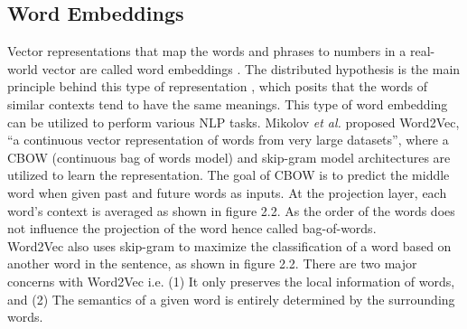 \documentclass[%
	BCOR=8mm, %
	DIV=12,
	toc=bibliography, %
	toc=listof, %
	oneside, %
	egregdoesnotlikesansseriftitles, %
	]{scrbook}
\begin{document}
\subsection{Word Embeddings}
\label{subsection:wordembeddings}
Vector representations that map the words and phrases to numbers in a real-world vector are called  word embeddings \cite{almeida_word_2019-1}. The distributed hypothesis is the main principle behind this type of representation \cite{harris_distributional_1954}, which posits that the words of similar contexts tend to have the same meanings. This type of word embedding can be utilized to perform various NLP tasks. Mikolov \textit{et al.} \cite{mikolov_efficient_2013} proposed Word2Vec, ``a continuous vector representation of words from very large datasets'', where a CBOW (continuous bag of words model) and skip-gram model architectures are utilized to learn the representation. The goal of CBOW is to predict the middle word when given past and future words as inputs. At the projection layer, each word's context is averaged as shown in figure 2.2. As the order of the words does not influence the projection of the word hence called bag-of-words. \\
Word2Vec also uses skip-gram to maximize the classification of a word based on another word in the  sentence, as shown in figure 2.2.  There are two major concerns with Word2Vec i.e. (1) It only preserves the local information of words,  and (2) The semantics of a given word is entirely determined by the surrounding words.
\end{document}
